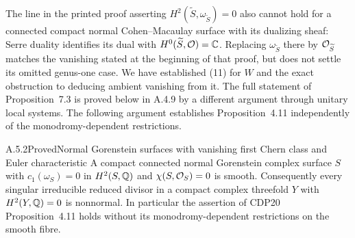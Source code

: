 The line in the printed proof asserting $H^2(\widetilde S,\omega_{\widetilde S})=0$ also cannot hold for a connected compact normal Cohen--Macaulay surface with its dualizing sheaf: Serre duality identifies its dual with $H^0(\widetilde S,\mathcal O)=\mathbb C$. Replacing $\omega_{\widetilde S}$ there by $\mathcal O_{\widetilde S}$ matches the vanishing stated at the beginning of that proof, but does not settle its omitted genus-one case. We have established (11) for $W$ and the exact obstruction to deducing ambient vanishing from it. The full statement of Proposition~7.3 is proved below in A.4.9 by a different argument through unitary local systems. The following argument establishes Proposition~4.11 independently of the monodromy-dependent restrictions.



\begin{statement}{A.5.2}{Proved}{Normal Gorenstein surfaces with vanishing first Chern class and Euler characteristic}
A compact connected normal Gorenstein complex surface $S$ with $c_1(\omega_S)=0$ in $H^2(S,\mathbb Q)$ and $\chi(S,\mathcal O_S)=0$ is smooth. Consequently every singular irreducible reduced divisor in a compact complex threefold $Y$ with $H^2(Y,\mathbb Q)=0$ is nonnormal. In particular the assertion of CDP20 Proposition~4.11 holds without its monodromy-dependent restrictions on the smooth fibre.
\end{statement}
